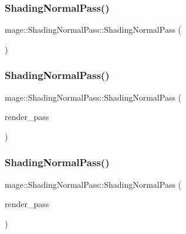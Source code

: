 \subsubsection{\texorpdfstring{Shading\+Normal\+Pass()}{ShadingNormalPass()}\hspace{0.1cm}{\footnotesize\ttfamily [1/3]}}
{\footnotesize\ttfamily mage\+::\+Shading\+Normal\+Pass\+::\+Shading\+Normal\+Pass (\begin{DoxyParamCaption}{ }\end{DoxyParamCaption})}

\hypertarget{classmage_1_1_shading_normal_pass_ab13b45f9a3118f8494150d64ff06f94f}{}\label{classmage_1_1_shading_normal_pass_ab13b45f9a3118f8494150d64ff06f94f} 
\subsubsection{\texorpdfstring{Shading\+Normal\+Pass()}{ShadingNormalPass()}\hspace{0.1cm}{\footnotesize\ttfamily [2/3]}}
{\footnotesize\ttfamily mage\+::\+Shading\+Normal\+Pass\+::\+Shading\+Normal\+Pass (\begin{DoxyParamCaption}\item[{const \hyperlink{classmage_1_1_shading_normal_pass}{Shading\+Normal\+Pass} \&}]{render\+\_\+pass }\end{DoxyParamCaption})\hspace{0.3cm}{\ttfamily [delete]}}

\hypertarget{classmage_1_1_shading_normal_pass_acc466f246daaf57ccace5aa8782f0799}{}\label{classmage_1_1_shading_normal_pass_acc466f246daaf57ccace5aa8782f0799} 
\subsubsection{\texorpdfstring{Shading\+Normal\+Pass()}{ShadingNormalPass()}\hspace{0.1cm}{\footnotesize\ttfamily [3/3]}}
{\footnotesize\ttfamily mage\+::\+Shading\+Normal\+Pass\+::\+Shading\+Normal\+Pass (\begin{DoxyParamCaption}\item[{\hyperlink{classmage_1_1_shading_normal_pass}{Shading\+Normal\+Pass} \&\&}]{render\+\_\+pass }\end{DoxyParamCaption})\hspace{0.3cm}{\ttfamily [default]}}

